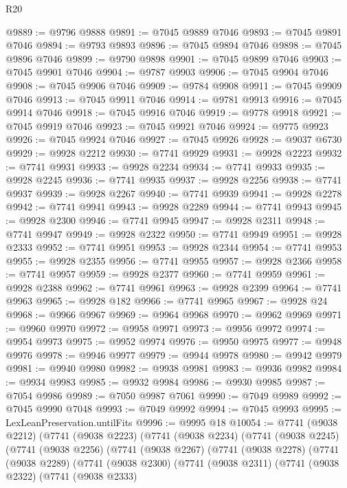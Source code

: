 \begin{lexlean}{R20}
\begin{coremodule}
{@9889 := @9796 @9888
@9891 := @7045 @9889 @7046
@9893 := @7045 @9891 @7046
@9894 := @9793 @9893
@9896 := @7045 @9894 @7046
@9898 := @7045 @9896 @7046
@9899 := @9790 @9898
@9901 := @7045 @9899 @7046
@9903 := @7045 @9901 @7046
@9904 := @9787 @9903
@9906 := @7045 @9904 @7046
@9908 := @7045 @9906 @7046
@9909 := @9784 @9908
@9911 := @7045 @9909 @7046
@9913 := @7045 @9911 @7046
@9914 := @9781 @9913
@9916 := @7045 @9914 @7046
@9918 := @7045 @9916 @7046
@9919 := @9778 @9918
@9921 := @7045 @9919 @7046
@9923 := @7045 @9921 @7046
@9924 := @9775 @9923
@9926 := @7045 @9924 @7046
@9927 := @7045 @9926
@9928 := @9037 @6730
@9929 := @9928 @2212
@9930 := @7741 @9929
@9931 := @9928 @2223
@9932 := @7741 @9931
@9933 := @9928 @2234
@9934 := @7741 @9933
@9935 := @9928 @2245
@9936 := @7741 @9935
@9937 := @9928 @2256
@9938 := @7741 @9937
@9939 := @9928 @2267
@9940 := @7741 @9939
@9941 := @9928 @2278
@9942 := @7741 @9941
@9943 := @9928 @2289
@9944 := @7741 @9943
@9945 := @9928 @2300
@9946 := @7741 @9945
@9947 := @9928 @2311
@9948 := @7741 @9947
@9949 := @9928 @2322
@9950 := @7741 @9949
@9951 := @9928 @2333
@9952 := @7741 @9951
@9953 := @9928 @2344
@9954 := @7741 @9953
@9955 := @9928 @2355
@9956 := @7741 @9955
@9957 := @9928 @2366
@9958 := @7741 @9957
@9959 := @9928 @2377
@9960 := @7741 @9959
@9961 := @9928 @2388
@9962 := @7741 @9961
@9963 := @9928 @2399
@9964 := @7741 @9963
@9965 := @9928 @182
@9966 := @7741 @9965
@9967 := @9928 @24
@9968 := @9966 @9967
@9969 := @9964 @9968
@9970 := @9962 @9969
@9971 := @9960 @9970
@9972 := @9958 @9971
@9973 := @9956 @9972
@9974 := @9954 @9973
@9975 := @9952 @9974
@9976 := @9950 @9975
@9977 := @9948 @9976
@9978 := @9946 @9977
@9979 := @9944 @9978
@9980 := @9942 @9979
@9981 := @9940 @9980
@9982 := @9938 @9981
@9983 := @9936 @9982
@9984 := @9934 @9983
@9985 := @9932 @9984
@9986 := @9930 @9985
@9987 := @7054 @9986
@9989 := @7050 @9987 @7061
@9990 := @7049 @9989
@9992 := @7045 @9990 @7048
@9993 := @7049 @9992
@9994 := @7045 @9993
@9995 := LexLeanPreservation.untilFits
@9996 := @9995 @18
@10054 := @7741
    (@9038 @2212)
    (@7741
      (@9038 @2223)
      (@7741
        (@9038 @2234)
        (@7741
          (@9038 @2245)
          (@7741
            (@9038 @2256)
            (@7741
              (@9038 @2267)
              (@7741
                (@9038 @2278)
                (@7741
                  (@9038 @2289)
                  (@7741
                    (@9038 @2300)
                    (@7741
                      (@9038 @2311)
                      (@7741
                        (@9038 @2322)
                        (@7741
                          (@9038 @2333)
}
\end{coremodule}
\end{lexlean}

